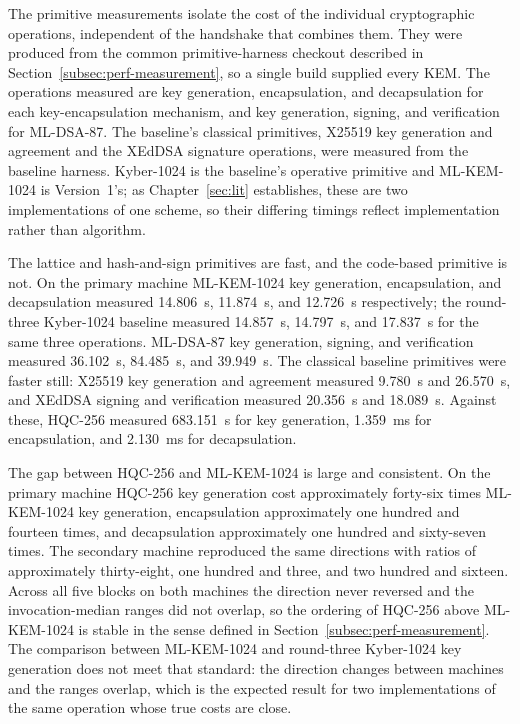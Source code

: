 The primitive measurements isolate the cost of the individual cryptographic operations, independent of the handshake that combines them. They were produced from the common primitive-harness checkout described in Section~\ref{subsec:perf-measurement}, so a single build supplied every KEM. The operations measured are key generation, encapsulation, and decapsulation for each key-encapsulation mechanism, and key generation, signing, and verification for ML-DSA-87. The baseline's classical primitives, X25519 key generation and agreement and the XEdDSA signature operations, were measured from the baseline harness. Kyber-1024 is the baseline's operative primitive and ML-KEM-1024 is Version~1's; as Chapter~\ref{sec:lit} establishes, these are two implementations of one scheme, so their differing timings reflect implementation rather than algorithm.

The lattice and hash-and-sign primitives are fast, and the code-based primitive is not. On the primary machine ML-KEM-1024 key generation, encapsulation, and decapsulation measured 14.806~\textmu s, 11.874~\textmu s, and 12.726~\textmu s respectively; the round-three Kyber-1024 baseline measured 14.857~\textmu s, 14.797~\textmu s, and 17.837~\textmu s for the same three operations. ML-DSA-87 key generation, signing, and verification measured 36.102~\textmu s, 84.485~\textmu s, and 39.949~\textmu s. The classical baseline primitives were faster still: X25519 key generation and agreement measured 9.780~\textmu s and 26.570~\textmu s, and XEdDSA signing and verification measured 20.356~\textmu s and 18.089~\textmu s. Against these, HQC-256 measured 683.151~\textmu s for key generation, 1.359~ms for encapsulation, and 2.130~ms for decapsulation.

The gap between HQC-256 and ML-KEM-1024 is large and consistent. On the primary machine HQC-256 key generation cost approximately forty-six times ML-KEM-1024 key generation, encapsulation approximately one hundred and fourteen times, and decapsulation approximately one hundred and sixty-seven times. The secondary machine reproduced the same directions with ratios of approximately thirty-eight, one hundred and three, and two hundred and sixteen. Across all five blocks on both machines the direction never reversed and the invocation-median ranges did not overlap, so the ordering of HQC-256 above ML-KEM-1024 is stable in the sense defined in Section~\ref{subsec:perf-measurement}. The comparison between ML-KEM-1024 and round-three Kyber-1024 key generation does not meet that standard: the direction changes between machines and the ranges overlap, which is the expected result for two implementations of the same operation whose true costs are close.

